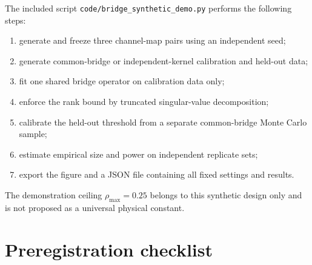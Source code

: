 \documentclass[11pt]{article}
\begin{document}
The included script \texttt{code/bridge\_synthetic\_demo.py} performs the following steps:
\begin{enumerate}[leftmargin=1.55em]
\item generate and freeze three channel-map pairs using an independent seed;
\item generate common-bridge or independent-kernel calibration and held-out data;
\item fit one shared bridge operator on calibration data only;
\item enforce the rank bound by truncated singular-value decomposition;
\item calibrate the held-out threshold from a separate common-bridge Monte Carlo sample;
\item estimate empirical size and power on independent replicate sets;
\item export the figure and a JSON file containing all fixed settings and results.
\end{enumerate}
The demonstration ceiling \(\rho_{\max}=0.25\) belongs to this synthetic design only and is not proposed as a universal physical constant.

\section{Preregistration checklist}
\end{document}
